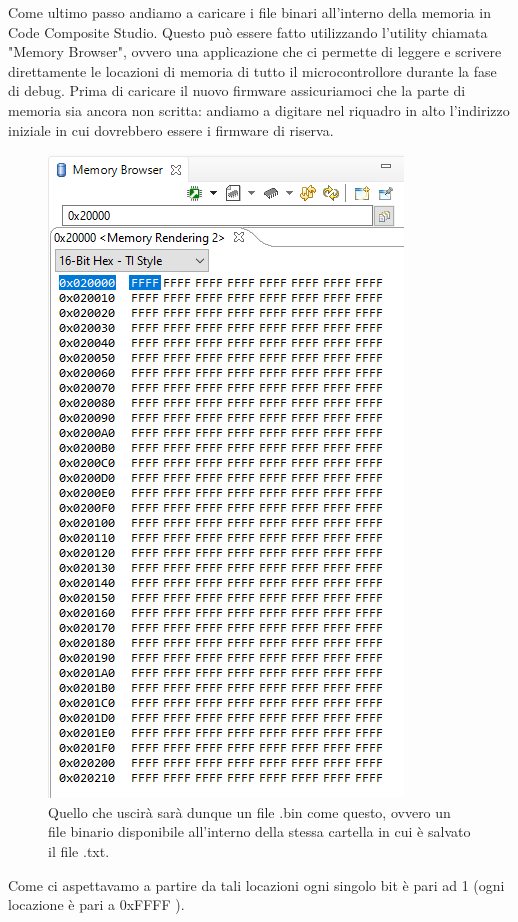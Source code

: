 \documentclass[LaM,binding=0.6cm]{../sapthesis}
\begin{document}
Come ultimo passo andiamo a caricare i file binari all'interno della memoria in Code Composite Studio.
Questo può essere fatto utilizzando l'utility chiamata "Memory Browser", ovvero una applicazione che ci permette di leggere e scrivere direttamente le locazioni di memoria di tutto il microcontrollore durante la fase di debug.
\newpage
Prima di caricare il nuovo firmware assicuriamoci che la parte di memoria sia ancora non scritta: andiamo a digitare nel riquadro in alto l'indirizzo iniziale in cui dovrebbero essere i firmware di riserva.
\begin{figure}[htbp]
\centerline{\includegraphics[scale=0.58]{examples/MemoryBrowserTi.PNG}}
\caption{Quello che uscirà sarà dunque un file .bin come questo, ovvero un file binario disponibile all'interno della stessa cartella in cui è salvato il file .txt.}
\label{fig}
\end{figure}
\newline


Come ci aspettavamo a partire da tali locazioni ogni singolo bit è pari ad 1 (ogni locazione è pari a 0xFFFF ). 
\end{document}

